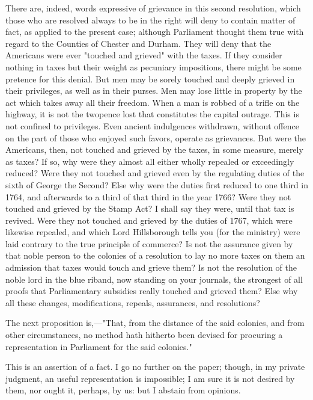 There are, indeed, words expressive of grievance in this second resolution, which those who are resolved always to be in the right will deny to contain matter of fact, as applied to the present case; although Parliament thought them true with regard to the Counties of Chester and Durham. They will deny that the Americans were ever "touched and grieved" with the taxes. If they consider nothing in taxes but their weight as pecuniary impositions, there might be some pretence for this denial. But men may be sorely touched and deeply grieved in their privileges, as well as in their purses. Men may lose little in property by the act which takes away all their freedom. When a man is robbed of a trifle on the highway, it is not the twopence lost that constitutes the capital outrage. This is not confined to privileges. Even ancient indulgences withdrawn, without offence on the part of those who enjoyed such favors, operate as grievances. But were the Americans, then, not touched and grieved by the taxes, in some measure, merely as taxes? If so, why were they almost all either wholly repealed or exceedingly reduced? Were they not touched and grieved even by the regulating duties of the sixth of George the Second? Else why were the duties first reduced to one third in 1764, and afterwards to a third of that third in the year 1766? Were they not touched and grieved by the Stamp Act? I shall say they were, until that tax is revived. Were they not touched and grieved by the duties of 1767, which were likewise repealed, and which Lord Hillsborough tells you (for the ministry) were laid contrary to the true principle of commerce? Is not the assurance given by that noble person to the colonies of a resolution to lay no more taxes on them an admission that taxes would touch and grieve them? Is not the resolution of the noble lord in the blue riband, now standing on your journals, the strongest of all proofs that Parliamentary subsidies really touched and grieved them? Else why all these changes, modifications, repeals, assurances, and resolutions?

The next proposition is,—"That, from the distance of the said colonies, and from other circumstances, no method hath hitherto been devised for procuring a representation in Parliament for the said colonies."

This is an assertion of a fact. I go no further on the paper; though, in my private judgment, an useful representation is impossible; I am sure it is not desired by them, nor ought it, perhaps, by us: but I abstain from opinions.

